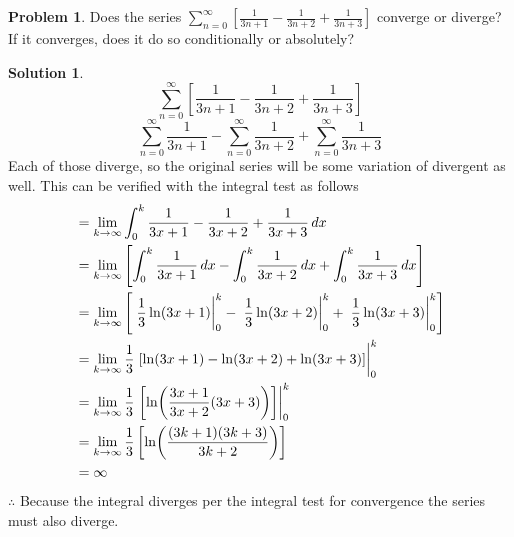 \documentclass[10pt]{article}
\theoremstyle{definition}
\newtheorem{problem}{Problem}
\newtheorem{soln}{Solution}
\begin{document}
\begin{problem}
Does the series $\displaystyle \sum_{n = 0}^{\infty} \left[\frac{1}{3n+1}-\frac{1}{3n+2}+\frac{1}{3n+3}\right]$ converge or diverge? If it converges, does it do so conditionally or absolutely?
\end{problem}
\begin{soln} ~\\
     $$\sum_{n = 0}^{\infty} \left[\frac{1}{3n+1}-\frac{1}{3n+2}+\frac{1}{3n+3}\right]$$
     $$\sum_{n = 0}^{\infty} \frac{1}{3n+1} - \sum_{n = 0}^{\infty}\frac{1}{3n+2} + \sum_{n = 0}^{\infty}\frac{1}{3n+3}$$
     Each of those diverge, so the original series will be some variation of divergent as well. This can be verified with the integral test as follows
     \begin{align*}
           & = \lim_{k \to \infty}  \int_{0}^{k} \frac{1}{3x+1}-\frac{1}{3x+2}+\frac{1}{3x+3} \,dx                                                                  \\
           & = \lim_{k \to \infty}  \left[\int_{0}^{k} \frac{1}{3x+1} \,dx - \int_{0}^{k} \frac{1}{3x+2} \,dx + \int_{0}^{k}\frac{1}{3x+3} \,dx\right]              \\
           & = \lim_{k \to \infty}  \left[\eval*{\frac{1}{3}\ln(3x+1)}_{0}^{k} - \eval*{\frac{1}{3}\ln(3x+2)}_{0}^{k} + \eval*{\frac{1}{3}\ln(3x+3)}_{0}^{k}\right] \\
           & = \lim_{k \to \infty}  \frac{1}{3}\eval*{\left[\ln(3x+1) - \ln(3x+2) + \ln(3x+3)\right]}_{0}^{k}                                                       \\
           & = \lim_{k \to \infty}  \frac{1}{3}\eval*{\left[\ln(\frac{3x+1}{3x+2}(3x+3))\right]}_{0}^{k}                                                            \\
           & = \lim_{k \to \infty}  \frac{1}{3}\left[\ln(\frac{(3k+1)(3k+3)}{3k+2})\right]                                                                          \\
           & = \infty                                                                                                                                               \\
     \end{align*}
     $\therefore$ Because the integral diverges per the integral test for convergence the series must also diverge.
\end{soln}
\end{document}
